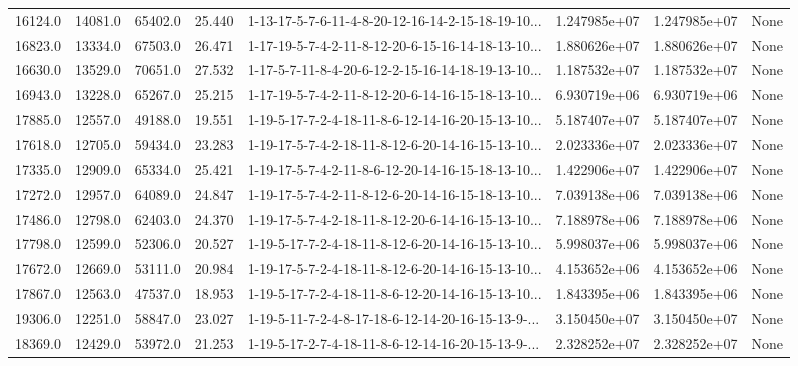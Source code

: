 \begin{tabular}{rrrrlrrl}
 16124.0 &  14081.0 &        65402.0 &             25.440 &  1-13-17-5-7-6-11-4-8-20-12-16-14-2-15-18-19-10... &  1.247985e+07 &  1.247985e+07 &   None \\
 16823.0 &  13334.0 &        67503.0 &             26.471 &  1-17-19-5-7-4-2-11-8-12-20-6-15-16-14-18-13-10... &  1.880626e+07 &  1.880626e+07 &   None \\
 16630.0 &  13529.0 &        70651.0 &             27.532 &  1-17-5-7-11-8-4-20-6-12-2-15-16-14-18-19-13-10... &  1.187532e+07 &  1.187532e+07 &   None \\
 16943.0 &  13228.0 &        65267.0 &             25.215 &  1-17-19-5-7-4-2-11-8-12-20-6-14-16-15-18-13-10... &  6.930719e+06 &  6.930719e+06 &   None \\
 17885.0 &  12557.0 &        49188.0 &             19.551 &  1-19-5-17-7-2-4-18-11-8-6-12-14-16-20-15-13-10... &  5.187407e+07 &  5.187407e+07 &   None \\
 17618.0 &  12705.0 &        59434.0 &             23.283 &  1-19-17-5-7-4-2-18-11-8-12-6-20-14-16-15-13-10... &  2.023336e+07 &  2.023336e+07 &   None \\
 17335.0 &  12909.0 &        65334.0 &             25.421 &  1-19-17-5-7-4-2-11-8-6-12-20-14-16-15-18-13-10... &  1.422906e+07 &  1.422906e+07 &   None \\
 17272.0 &  12957.0 &        64089.0 &             24.847 &  1-19-17-5-7-4-2-11-8-12-6-20-14-16-15-18-13-10... &  7.039138e+06 &  7.039138e+06 &   None \\
 17486.0 &  12798.0 &        62403.0 &             24.370 &  1-19-17-5-7-4-2-18-11-8-12-20-6-14-16-15-13-10... &  7.188978e+06 &  7.188978e+06 &   None \\
 17798.0 &  12599.0 &        52306.0 &             20.527 &  1-19-5-17-7-2-4-18-11-8-12-6-20-14-16-15-13-10... &  5.998037e+06 &  5.998037e+06 &   None \\
 17672.0 &  12669.0 &        53111.0 &             20.984 &  1-19-17-5-7-2-4-18-11-8-12-6-20-14-16-15-13-10... &  4.153652e+06 &  4.153652e+06 &   None \\
 17867.0 &  12563.0 &        47537.0 &             18.953 &  1-19-5-17-7-2-4-18-11-8-6-12-20-14-16-15-13-10... &  1.843395e+06 &  1.843395e+06 &   None \\
 19306.0 &  12251.0 &        58847.0 &             23.027 &  1-19-5-11-7-2-4-8-17-18-6-12-14-20-16-15-13-9-... &  3.150450e+07 &  3.150450e+07 &   None \\
 18369.0 &  12429.0 &        53972.0 &             21.253 &  1-19-5-17-2-7-4-18-11-8-6-12-14-16-20-15-13-9-... &  2.328252e+07 &  2.328252e+07 &   None \\

\end{tabular}
